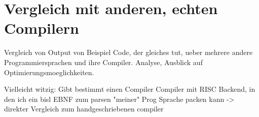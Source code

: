 \chapter{Vergleich mit anderen, echten Compilern}
\label{chapter}

Vergleich von Output von Beispiel Code, der gleiches tut, ueber mehrere andere Programmiersprachen und ihre Compiler.
Analyse, Ausblick auf Optimierungsmoeglichkeiten.

Vielleicht witzig: Gibt bestimmt einen Compiler Compiler mit RISC Backend, in den ich ein bisl EBNF zum parsen "meiner" Prog Sprache packen kann -> direkter Vergleich zum handgeschriebenen compiler
